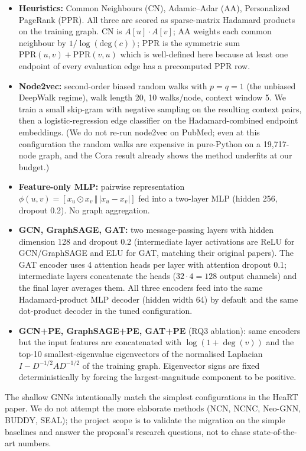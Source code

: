 \documentclass[10pt,a4paper]{article}
\begin{document}
\begin{itemize}
\item \textbf{Heuristics:} Common Neighbours (CN), Adamic--Adar (AA),
  Personalized PageRank (PPR). All three are scored as sparse-matrix
  Hadamard products on the training graph. CN is $A[u] \cdot A[v]$; AA
  weights each common neighbour by $1/\log(\mathrm{deg}(c))$; PPR is
  the symmetric sum $\mathrm{PPR}(u, v) + \mathrm{PPR}(v, u)$ which is
  well-defined here because at least one endpoint of every evaluation
  edge has a precomputed PPR row.
\item \textbf{Node2vec:} second-order biased random walks with $p=q=1$
  (the unbiased DeepWalk regime), walk length 20, 10 walks/node,
  context window 5. We train a small skip-gram with negative sampling
  on the resulting context pairs, then a logistic-regression edge
  classifier on the Hadamard-combined endpoint embeddings. (We do not
  re-run node2vec on PubMed; even at this configuration the random
  walks are expensive in pure-Python on a 19{,}717-node graph, and the
  Cora result already shows the method underfits at our budget.)
\item \textbf{Feature-only MLP:} pairwise representation
  $\phi(u, v) = [x_u \odot x_v \,\Vert\, |x_u - x_v|]$ fed into a two-layer
  MLP (hidden 256, dropout 0.2). No graph aggregation.
\item \textbf{GCN, GraphSAGE, GAT:} two message-passing layers with hidden
  dimension 128 and dropout 0.2 (intermediate layer activations are
  ReLU for GCN/GraphSAGE and ELU for GAT, matching their original
  papers). The GAT encoder uses 4 attention heads per layer with
  attention dropout 0.1; intermediate layers concatenate the heads
  ($32 \cdot 4 = 128$ output channels) and the final layer averages
  them. All three encoders feed into the same Hadamard-product MLP
  decoder (hidden width 64) by default and the same dot-product decoder
  in the tuned configuration.
\item \textbf{GCN+PE, GraphSAGE+PE, GAT+PE} (RQ3 ablation): same encoders
  but the input features are concatenated with $\log(1 + \deg(v))$ and
  the top-10 smallest-eigenvalue eigenvectors of the normalised Laplacian
  $I - D^{-1/2} A D^{-1/2}$ of the training graph. Eigenvector signs are
  fixed deterministically by forcing the largest-magnitude component to
  be positive.
\end{itemize}

The shallow GNNs intentionally match the simplest configurations in the
HeaRT paper. We do not attempt the more elaborate methods (NCN, NCNC,
Neo-GNN, BUDDY, SEAL); the project scope is to validate the migration on
the simple baselines and answer the proposal's research questions, not to
chase state-of-the-art numbers.
\end{document}
